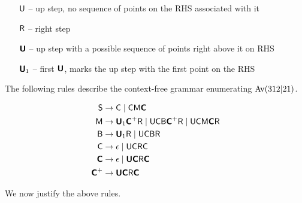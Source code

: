 \documentclass[12pt, a4paper, twoside]{report}
\begin{document}
\begin{enumerate}
\item[$\fU$ --] up step, no sequence of points on the RHS associated with it
\item[$\fR$ --] right step
\item[$\bU$ --] up step with a possible sequence of points right above it on RHS
\item[$\bU_1$ --] first $\bU$, marks the up step with the first point on the RHS
\end{enumerate}

\noindent The following rules describe the context-free grammar enumerating $\Av(312|21)$.  

\begin{align*}
\fS &\to \fC \mid \fC\fM\bC\\
\fM &\to \bU_1\bC^+\fR \mid \fU\fC\fB\bC^+\fR \mid \fU\fC\fM\bC\fR\\
\fB &\to \bU_1\fR \mid \fU\fC\fB\fR\\
\fC &\to \epsilon \mid \fU\fC\fR\fC\\
\bC &\to \epsilon \mid \bU\bC\fR\bC\\
\bC^+ &\to \bU\bC\fR\bC
\end{align*}

\noindent We now justify the above rules.
\end{document}
